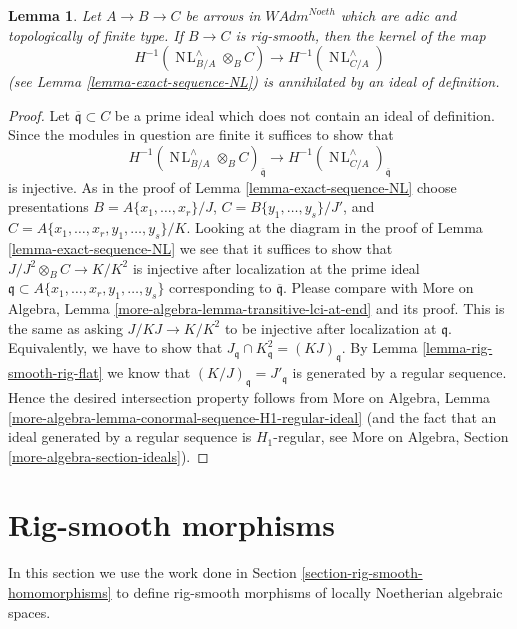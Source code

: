 \documentclass{stacks-project}
\theoremstyle{plain}
\newtheorem{lemma}[subsection]{Lemma}
\theoremstyle{definition}
\theoremstyle{remark}
\numberwithin{equation}{subsection}
\def\NL{\mathop{N\!L}\nolimits}
\begin{document}
\begin{lemma}
\label{lemma-exact-sequence-NL-rig-smooth}
Let $A \to B \to C$ be arrows in $\textit{WAdm}^{Noeth}$
which are adic and topologically of finite type. If $B \to C$
is rig-smooth, then the kernel of the map
$$
H^{-1}(\NL_{B/A}^\wedge \otimes_B C) \to H^{-1}(\NL_{C/A}^\wedge)
$$
(see Lemma \ref{lemma-exact-sequence-NL})
is annihilated by an ideal of definition.
\end{lemma}

\begin{proof}
Let $\overline{\mathfrak q} \subset C$ be a prime ideal which does not contain
an ideal of definition. Since the modules in question are finite
it suffices to show that
$$
H^{-1}(\NL_{B/A}^\wedge \otimes_B C)_{\overline{\mathfrak q}} \to
H^{-1}(\NL_{C/A}^\wedge)_{\overline{\mathfrak q}}
$$
is injective. As in the proof of Lemma \ref{lemma-exact-sequence-NL}
choose presentations $B = A\{x_1, \ldots, x_r\}/J$,
$C = B\{y_1, \ldots, y_s\}/J'$, and
$C = A\{x_1, \ldots, x_r, y_1, \ldots, y_s\}/K$.
Looking at the diagram in the proof of Lemma \ref{lemma-exact-sequence-NL}
we see that it suffices to show that $J/J^2 \otimes_B C \to K/K^2$
is injective after localization at the prime ideal
$\mathfrak q \subset A\{x_1, \ldots, x_r, y_1, \ldots, y_s\}$
corresponding to $\overline{\mathfrak q}$. Please compare with
More on Algebra, Lemma \ref{more-algebra-lemma-transitive-lci-at-end}
and its proof. This is the same as 
asking $J/KJ \to K/K^2$ to be injective after localization
at $\mathfrak q$. Equivalently, we have to show that
$J_\mathfrak q \cap K^2_\mathfrak q = (KJ)_\mathfrak q$.
By Lemma \ref{lemma-rig-smooth-rig-flat}
we know that $(K/J)_\mathfrak q = J'_\mathfrak q$
is generated by a regular sequence.
Hence the desired intersection property follows from
More on Algebra, Lemma
\ref{more-algebra-lemma-conormal-sequence-H1-regular-ideal}
(and the fact that an ideal generated by a regular sequence
is $H_1$-regular, see
More on Algebra, Section \ref{more-algebra-section-ideals}).
\end{proof}









\section{Rig-smooth morphisms}
\label{section-rig-smooth-morphisms}

\noindent
In this section we use the work done in
Section \ref{section-rig-smooth-homomorphisms}
to define rig-smooth morphisms of locally Noetherian algebraic spaces.
\end{document}
